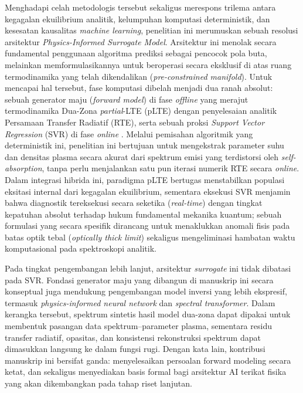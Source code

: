 \documentclass[10pt,leqno]{amsart}
\begin{document}
Menghadapi celah metodologis tersebut sekaligus merespons trilema antara kegagalan ekuilibrium analitik, kelumpuhan komputasi deterministik, dan kesesatan kausalitas \textit{machine learning}, penelitian ini merumuskan sebuah resolusi arsitektur \textit{Physics-Informed Surrogate Model}. Arsitektur ini menolak secara fundamental penggunaan algoritma prediksi sebagai pencocok pola buta, melainkan memformulasikannya untuk beroperasi secara eksklusif di atas ruang termodinamika yang telah dikendalikan (\textit{pre-constrained manifold}). Untuk mencapai hal tersebut, fase komputasi dibelah menjadi dua ranah absolut: sebuah generator maju (\textit{forward model}) di fase \textit{offline} yang merajut termodinamika Dua-Zona \textit{partial}-LTE (pLTE) \cite{zaitsev_two-zone_2024} dengan penyelesaian analitik Persamaan Transfer Radiatif (RTE), serta sebuah proksi \textit{Support Vector Regression} (SVR) di fase \textit{online} \cite{wu_novel_2025}. Melalui pemisahan algoritmik yang deterministik ini, penelitian ini bertujuan untuk mengekstrak parameter suhu dan densitas plasma secara akurat dari spektrum emisi yang terdistorsi oleh \textit{self-absorption}, tanpa perlu menjalankan satu pun iterasi numerik RTE secara \textit{online}. Dalam integrasi hibrida ini, paradigma pLTE bertugas menstabilkan populasi eksitasi internal dari kegagalan ekuilibrium, sementara eksekusi SVR menjamin bahwa diagnostik tereksekusi secara seketika (\textit{real-time}) dengan tingkat kepatuhan absolut terhadap hukum fundamental mekanika kuantum; sebuah formulasi yang secara spesifik dirancang untuk menaklukkan anomali fisis pada batas optik tebal (\textit{optically thick limit}) sekaligus mengeliminasi hambatan waktu komputasional pada spektroskopi analitik.

Pada tingkat pengembangan lebih lanjut, arsitektur \textit{surrogate} ini tidak dibatasi pada SVR. Fondasi generator maju yang dibangun di manuskrip ini secara konseptual juga mendukung pengembangan model inversi yang lebih ekspresif, termasuk \textit{physics-informed neural network} dan \textit{spectral transformer}. Dalam kerangka tersebut, spektrum sintetis hasil model dua-zona dapat dipakai untuk membentuk pasangan data spektrum--parameter plasma, sementara residu transfer radiatif, opasitas, dan konsistensi rekonstruksi spektrum dapat dimasukkan langsung ke dalam fungsi rugi. Dengan kata lain, kontribusi manuskrip ini bersifat ganda: menyelesaikan persoalan forward modeling secara ketat, dan sekaligus menyediakan basis formal bagi arsitektur AI terikat fisika yang akan dikembangkan pada tahap riset lanjutan.
\end{document}
